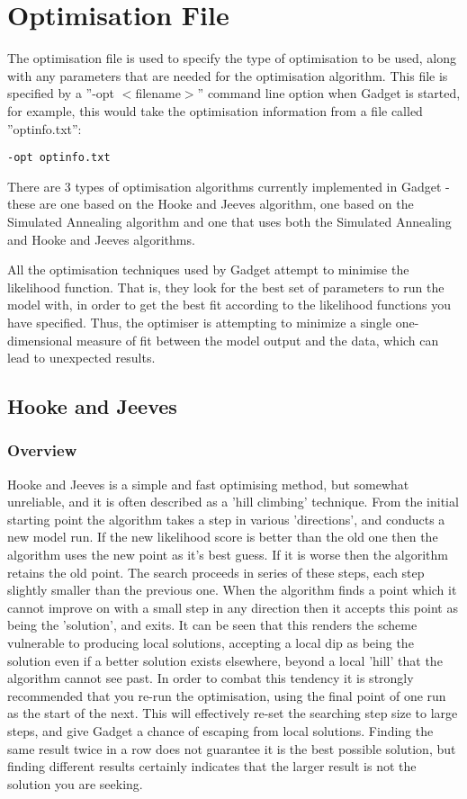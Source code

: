 \documentclass [a4paper, 10pt]{book}
\begin{document}
\chapter{Optimisation File}\label{chap:optim}
The optimisation file is used to specify the type of optimisation to be used, along with any parameters that are needed for the optimisation algorithm.  This file is specified by a ''-opt $<$filename$>$'' command line option when Gadget is started, for example, this would take the optimisation information from a file called ''optinfo.txt'':

{\small\begin{verbatim}
-opt optinfo.txt
\end{verbatim}}

There are 3 types of optimisation algorithms currently implemented in Gadget - these are one based on the Hooke and Jeeves algorithm, one based on the Simulated Annealing algorithm and one that uses both the Simulated Annealing and Hooke and Jeeves algorithms.

\bigskip
All the optimisation techniques used by Gadget attempt to minimise the likelihood function. That is, they look for the best set of parameters to run the model with, in order to get the best fit according to the likelihood functions you have specified.  Thus, the optimiser is attempting to minimize a single one-dimensional measure of fit between the model output and the data, which can lead to unexpected results.

\section{Hooke and Jeeves}\label{sec:hooke}
\subsection{Overview}\label{subsec:hookeover}
Hooke and Jeeves is a simple and fast optimising method, but somewhat unreliable, and it is often described as a 'hill climbing' technique.  From the initial starting point the algorithm takes a step in various 'directions', and conducts a new model run.  If the new likelihood score is better than the old one then the algorithm uses the new point as it's best guess.  If it is worse then the algorithm retains the old point.  The search proceeds in series of these steps, each step slightly smaller than the previous one.  When the algorithm finds a point which it cannot improve on with a small step in any direction then it accepts this point as being the 'solution', and exits.  It can be seen that this renders the scheme vulnerable to producing local solutions, accepting a local dip as being the solution even if a better solution exists elsewhere, beyond a local 'hill' that the algorithm cannot see past.  In order to combat this tendency it is strongly recommended that you re-run the optimisation, using the final point of one run as the start of the next.  This will effectively re-set the searching step size to large steps, and give Gadget a chance of escaping from local solutions.  Finding the same result twice in a row does not guarantee it is the best possible solution, but finding different results certainly indicates that the larger result is not the solution you are seeking.
\end{document}
